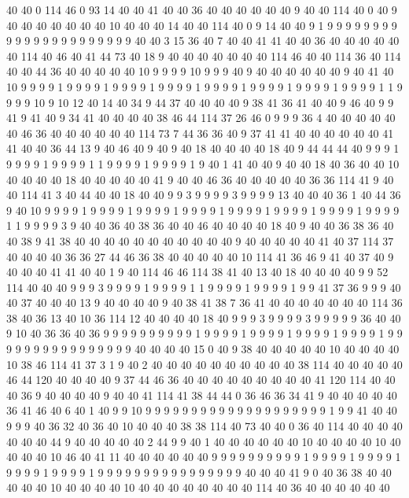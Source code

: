 40 40 0 114 46 0 93 14 40 40 41 40 40 36 40 40 40 40 40 40
9 40 40 114 40 0 40 9 40 40 40 40 40 40 40 10 40 40 40 14
40 40 114 40 0 9 14 40 40 9 1 9 9 9 9 9 9 9 9 9
9 9 9 9 9 9 9 9 9 9 9 9 9 40 40 3 15 36 40 7
40 40 41 41 40 40 36 40 40 40 40 40 40 114 40 46 40 41 44 73
40 18 9 40 40 40 40 40 40 40 114 46 40 40 114 36 40 114 40 40
44 36 40 40 40 40 40 10 9 9 9 9 10 9 9 9 40 9 40 40
40 40 40 40 9 40 41 40 10 9 9 9 9 1 9 9 9 9 1 9
9 9 9 1 9 9 9 9 1 9 9 9 9 1 9 9 9 9 1 9
9 9 9 1 9 9 9 9 1 1 9 9 9 9 10 9 10 12 40 14
40 34 9 44 37 40 40 40 40 9 38 41 36 41 40 40 9 46 40 9
9 41 9 41 40 9 34 41 40 40 40 40 38 46 44 114 37 26 46 0
9 9 9 36 4 40 40 40 40 40 40 46 36 40 40 40 40 40 40 114
73 7 44 36 36 40 9 37 41 41 40 40 40 40 40 40 41 41 40 40
36 44 13 9 40 46 40 9 40 9 40 18 40 40 40 40 18 40 9 44
44 44 40 9 9 9 1 9 9 9 9 1 9 9 9 9 1 1 9 9
9 9 1 9 9 9 9 1 9 40 1 41 40 40 9 40 40 18 40 36
40 40 10 40 40 40 40 18 40 40 40 40 40 41 9 40 40 46 36 40
40 40 40 40 36 36 114 41 9 40 40 114 41 3 40 44 40 40 18 40
40 9 9 3 9 9 9 9 3 9 9 9 9 13 40 40 40 36 1 40
44 36 9 40 10 9 9 9 9 1 9 9 9 9 1 9 9 9 9 1
9 9 9 9 1 9 9 9 9 1 9 9 9 9 1 9 9 9 9 1
9 9 9 9 1 1 9 9 9 9 3 9 40 40 36 40 38 36 40 40
46 40 40 40 40 18 40 9 40 40 36 38 36 40 40 38 9 41 38 40
40 40 40 40 40 40 40 40 40 40 9 40 40 40 40 40 41 40 37 114
37 40 40 40 40 36 36 27 44 46 36 38 40 40 40 40 40 10 114 41
36 46 9 41 40 37 40 9 40 40 40 41 41 40 40 1 9 40 114 46
46 114 38 41 40 13 40 18 40 40 40 40 9 9 52 114 40 40 40 9
9 9 3 9 9 9 9 1 9 9 9 9 1 1 9 9 9 9 1 9
9 9 9 1 9 9 41 37 36 9 9 9 40 40 37 40 40 40 13 9
40 40 40 40 9 40 38 41 38 7 36 41 40 40 40 40 40 40 40 114
36 38 40 36 13 40 10 36 114 12 40 40 40 40 18 40 9 9 9 3
9 9 9 9 3 9 9 9 9 9 36 40 40 9 10 40 36 36 40 36
9 9 9 9 9 9 9 9 9 9 1 9 9 9 9 1 9 9 9 9
1 9 9 9 9 1 9 9 9 9 1 9 9 9 9 9 9 9 9 9
9 9 9 9 9 9 9 40 40 40 40 15 0 40 9 38 40 40 40 40
40 10 40 40 40 40 10 38 46 114 41 37 3 1 9 40 2 40 40 40
40 40 40 40 40 40 40 38 114 40 40 40 40 40 46 44 120 40 40 40
40 9 37 44 46 36 40 40 40 40 40 40 40 40 40 41 120 114 40 40
40 36 9 40 40 40 40 9 40 40 41 114 41 38 44 44 0 36 46 36
34 41 9 40 40 40 40 40 36 41 46 40 6 40 1 40 9 9 10 9
9 9 9 9 9 9 9 9 9 9 9 9 9 9 9 9 9 9 9 1
9 9 41 40 40 9 9 9 40 36 32 40 36 40 10 40 40 40 38 38
114 40 73 40 40 0 36 40 114 40 40 40 40 40 40 40 44 9 40 40
40 40 40 2 44 9 9 40 1 40 40 40 40 40 40 10 40 40 40 40
10 40 40 40 40 10 46 40 41 11 40 40 40 40 40 40 9 9 9 9
9 9 9 9 9 9 1 9 9 9 9 1 9 9 9 9 1 9 9 9
9 1 9 9 9 9 1 9 9 9 9 9 9 9 9 9 9 9 9 9
9 9 9 40 40 40 41 9 0 40 36 38 40 40 40 40 40 10 40 40
40 40 10 40 40 40 40 40 40 40 40 114 40 36 40 40 40 40 40 40
